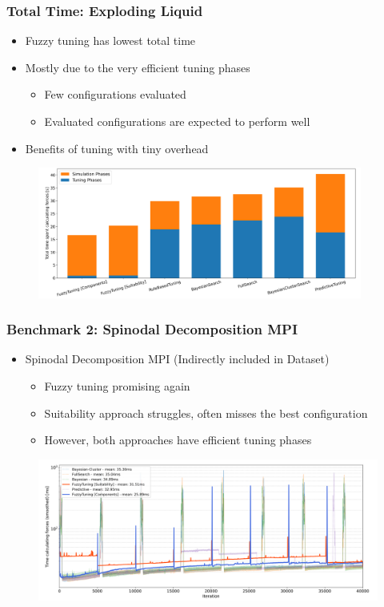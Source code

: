 \documentclass[
	10pt,
	t		%
]{beamer}
\begin{document}
\begin{frame}
	\frametitle{Total Time: Exploding Liquid}
	\begin{itemize}
		\item Fuzzy tuning has lowest total time
		\item Mostly due to the very efficient tuning phases
		      \begin{itemize}
			      \item Few configurations evaluated
			      \item Evaluated configurations are expected to perform well
		      \end{itemize}
		\item Benefits of tuning with tiny overhead
	\end{itemize}

	\begin{figure}
		\centering
		\includegraphics[width=0.95\textwidth]{figures/exploding-liquid-total.png}
	\end{figure}
\end{frame}

\begin{frame}
	\frametitle{Benchmark 2: Spinodal Decomposition MPI}

	\begin{itemize}
		\item Spinodal Decomposition MPI (Indirectly included in Dataset)
		      \begin{itemize}
			      \item Fuzzy tuning promising again
			      \item Suitability approach struggles, often misses the best configuration
			      \item However, both approaches have efficient tuning phases
		      \end{itemize}
	\end{itemize}

	\begin{figure}
		\centering
		\includegraphics[width=1\textwidth]{figures/spinodal-timings.png}
	\end{figure}
\end{frame}
\end{document}
